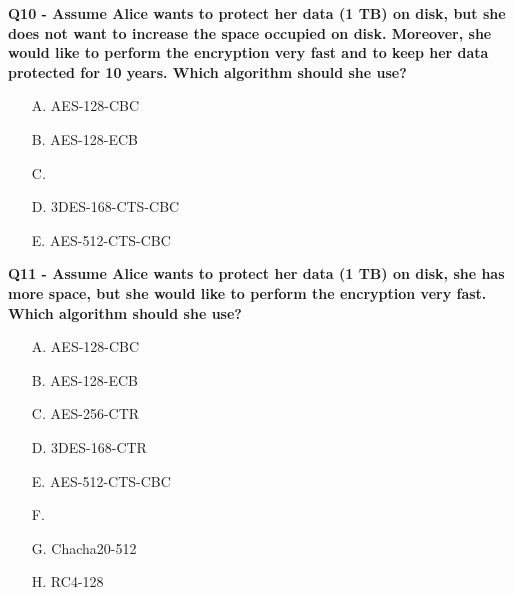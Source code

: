 \textbf{Q10 - Assume Alice wants to protect her data (1 TB) on disk, but she does not want to increase the space occupied on disk. Moreover, she would like to perform the encryption very fast and to keep her data protected for 10 years. Which algorithm should she use?}
\begin{enumerate}
    \item[A.] AES-128-CBC
    \item[B.] AES-128-ECB
    \item[C.] 
    \item[D.] 3DES-168-CTS-CBC
    \item[E.] AES-512-CTS-CBC
\end{enumerate}

\textbf{Q11 - Assume Alice wants to protect her data (1 TB) on disk, she has more space, but she would like to perform the encryption very fast. Which algorithm should she use?}
\begin{enumerate}
    \item[A.] AES-128-CBC
    \item[B.] AES-128-ECB
    \item[C.] AES-256-CTR
    \item[D.] 3DES-168-CTR
    \item[E.] AES-512-CTS-CBC
    \item[F.] 
    \item[G.] Chacha20-512
    \item[H.] RC4-128
\end{enumerate}

